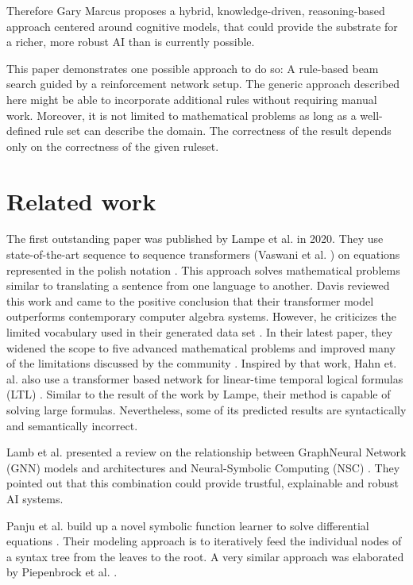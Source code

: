 \documentclass{scrartcl}
\theoremstyle{definition}
\begin{document}
Therefore Gary Marcus proposes a hybrid, knowledge-driven, reasoning-based approach centered around cognitive models,
that could provide the substrate for a richer, more robust AI than is currently possible. \cite{marcus2020decade}

This paper demonstrates one possible approach to do so:
A rule-based beam search guided by a reinforcement network setup.
The generic approach described here might be able to incorporate additional rules without requiring manual work.
Moreover, it is not limited to mathematical problems as long as a well-defined rule set can describe the domain.
The correctness of the result depends only on the correctness of the given ruleset.

\section{Related work}

The first outstanding paper was published by Lampe et al. in 2020.
They use state-of-the-art sequence to sequence transformers (Vaswani et al. \cite{vaswani2017attention}) on equations represented in the polish notation \cite{Lample2020Deep}.
This approach solves mathematical problems similar to translating a sentence from one language to another. 
Davis reviewed this work and came to the positive conclusion that their transformer model outperforms contemporary computer algebra systems.
However, he criticizes the limited vocabulary used in their generated data set \cite{davis2019use}.
In their latest paper, they widened the scope to five advanced mathematical problems and improved many of the limitations discussed by the community \cite{charton2021learning}.
Inspired by that work, Hahn et. al. also use a transformer based network for linear-time temporal logical formulas (LTL) \cite{hahn2021teaching}.
Similar to the result of the work by Lampe, their method is capable of solving large formulas.
Nevertheless, some of its predicted results are syntactically and semantically incorrect.

Lamb et al. presented a review on the relationship between GraphNeural Network (GNN) models and architectures and Neural-Symbolic Computing (NSC) \cite{lamb2020graph}.
They pointed out that this combination could provide trustful, explainable and robust AI systems.

Panju et al. build up a novel symbolic function learner to solve differential equations \cite{panju2020neurosymbolic}.
Their modeling approach is to iteratively feed the individual nodes of a syntax tree from the leaves to the root.
A very similar approach was elaborated by Piepenbrock et al. \cite{piepenbrock2021learning}. 
\end{document}
